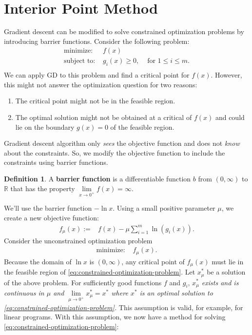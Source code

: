 \documentclass[
]{book}
\providecommand{\tightlist}{%
  \setlength{\itemsep}{0pt}\setlength{\parskip}{0pt}}
\theoremstyle{definition}
\newtheorem{definition}{Definition}[chapter]
\theoremstyle{definition}
\theoremstyle{definition}
\theoremstyle{definition}
\theoremstyle{remark}
\begin{document}
\hypertarget{interior-point-method}{%
\section{Interior Point Method}\label{interior-point-method}}

Gradient descent can be modified to solve constrained optimization problems by introducing barrier functions.
Consider the following problem:
\begin{equation}
  \begin{array}{llr}
    \mbox{minimize: } & f(x) \\
    \mbox{subject to: } & g_i(x) \ge 0, & \mbox{ for } 1 \le i \le m. \\
  \end{array}
  \label{eq:constrained-optimization-problem}
\end{equation}
We can apply GD to this problem and find a critical point for \(f(x)\). However, this might not answer the optimization question for two reasons:

\begin{enumerate}
\def\labelenumi{\arabic{enumi}.}
\tightlist
\item
  The critical point might not be in the feasible region.
\item
  The optimal solution might not be obtained at a critical of \(f(x)\) and could lie on the boundary \(g(x) = 0\) of the feasible region.
\end{enumerate}

Gradient descent algorithm only \emph{sees} the objective function and does not \emph{know} about the constraints. So, we modify the objective function to include the constraints using barrier functions.

\begin{definition}
A \textbf{barrier function} is a differentiable function \(b\) from \((0, \infty)\) to \(\mathbb{R}\) that has the property \(\lim \limits_{x \to 0^+} f(x) = \infty\).
\end{definition}

We'll use the barrier function \(-\ln x\). Using a small positive parameter \(\mu\), we create a new objective function:
\begin{align*}
  f_\mu(x) := & f(x) - \mu \sum \limits_{i = 1} ^ m \ln (g_i(x)).
\end{align*}
Consider the unconstrained optimization problem
\begin{align*}
  \mbox{minimize: } & f_\mu (x).
\end{align*}
Because the domain of \(\ln x\) is \((0, \infty)\), any critical point of \(f_\mu(x)\) must lie in the feasible region of \eqref{eq:constrained-optimization-problem}.
Let \(x_\mu^*\) be a solution of the above problem.
For sufficiently good functions \(f\) and \(g_i\), \emph{\(x_\mu^*\) exists and is continuous in \(\mu\) and \(\lim \limits_{\mu \to 0^+} x_\mu^* = x^*\) where \(x^*\) is an optimal solution to \eqref{eq:constrained-optimization-problem}.} This assumption is valid, for example, for linear programs. With this assumption, we now have a method for solving \eqref{eq:constrained-optimization-problem}:
\end{document}
